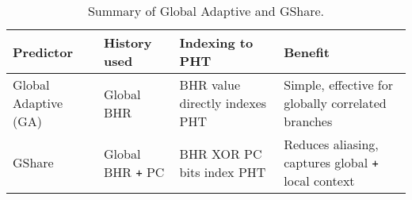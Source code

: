 \highspace
\begin{table}[!htp]
    \centering
    \begin{adjustbox}{width={\textwidth},totalheight={\textheight},keepaspectratio}
        \begin{tabular}{@{} l | l | l | p{12em} @{}}
            \toprule
            \textbf{Predictor} & \textbf{History used} & \textbf{Indexing to PHT} & \textbf{Benefit} \\
            \midrule
            Global Adaptive (GA) & Global BHR               & BHR value directly indexes PHT & Simple, effective for globally correlated branches \\ [.5em]
            GShare               & Global BHR \texttt{+} PC & BHR XOR PC bits index PHT      & Reduces aliasing, captures global \texttt{+} local context \\
            \bottomrule
        \end{tabular}
    \end{adjustbox}
    \caption{Summary of Global Adaptive and GShare.}
\end{table}
